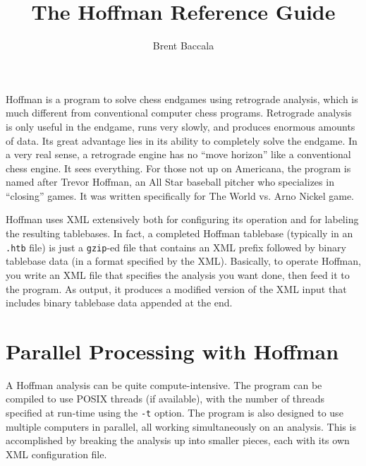 \documentclass[11pt]{article}
\title{The Hoffman Reference Guide}
\author{Brent Baccala}
\begin{document}
\maketitle

\parindent 0pt
\parskip 12pt

Hoffman is a program to solve chess endgames using retrograde
analysis, which is much different from conventional computer chess
programs.  Retrograde analysis is only useful in the endgame, runs
very slowly, and produces enormous amounts of data.  Its great
advantage lies in its ability to completely solve the endgame.  In a
very real sense, a retrograde engine has no ``move horizon'' like a
conventional chess engine.  It sees everything.  For those not up on
Americana, the program is named after Trevor Hoffman, an All Star
baseball pitcher who specializes in ``closing'' games.  It was written
specifically for The World vs. Arno Nickel game.

Hoffman uses XML extensively both for configuring its operation and
for labeling the resulting tablebases.  In fact, a completed Hoffman
tablebase (typically in an {\tt .htb} file) is just a {\tt gzip}-ed
file that contains an XML prefix followed by binary tablebase data (in
a format specified by the XML).  Basically, to operate Hoffman, you
write an XML file that specifies the analysis you want done, then feed
it to the program.  As output, it produces a modified version of the
XML input that includes binary tablebase data appended at the end.

\section{Parallel Processing with Hoffman}

A Hoffman analysis can be quite compute-intensive.  The program can be
compiled to use POSIX threads (if available), with the number of
threads specified at run-time using the {\tt -t} option.  The program
is also designed to use multiple computers in parallel, all working
simultaneously on an analysis.  This is accomplished by breaking the
analysis up into smaller pieces, each with its own XML configuration
file.

\end{document}
